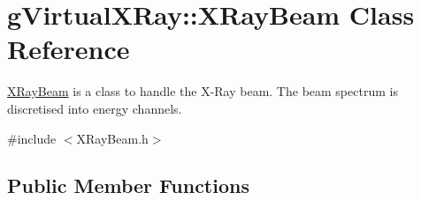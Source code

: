 \hypertarget{classg_virtual_x_ray_1_1_x_ray_beam}{
\section{gVirtualXRay::XRayBeam Class Reference}
\label{classg_virtual_x_ray_1_1_x_ray_beam}
}


\hyperlink{classg_virtual_x_ray_1_1_x_ray_beam}{XRayBeam} is a class to handle the X-\/Ray beam. The beam spectrum is discretised into energy channels.  




{\ttfamily \#include $<$XRayBeam.h$>$}

\subsection*{Public Member Functions}
